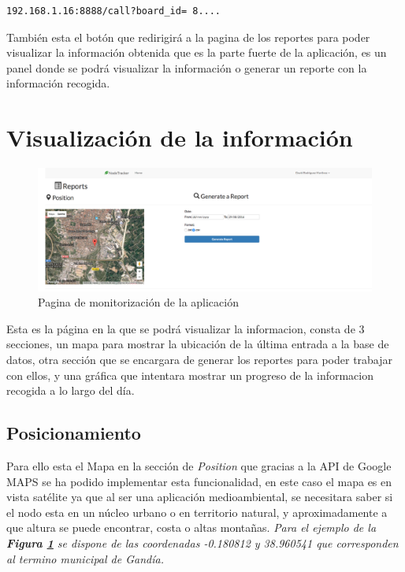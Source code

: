 \begin{lstlisting}[caption=Ejemplo para una ID diferente, label=getstringexaple]
192.168.1.16:8888/call?board_id= 8....
\end{lstlisting}

También esta el botón que redirigirá a la pagina de los reportes para poder visualizar la información obtenida que es la parte fuerte de la aplicación, es un panel donde se podrá visualizar la información o generar un reporte con la información recogida.
\clearpage

\section{Visualización  de la información}

\begin{figure}[!h]
	\centering
	\includegraphics[width=1.0\linewidth]{figuras/nodereport}
	\caption{Pagina de monitorización de la aplicación}
	\label{fig:nodereport}
\end{figure}

Esta es la página en la que se podrá visualizar la informacion, consta de 3 secciones, un mapa para mostrar la ubicación de la última entrada a la base de datos, otra sección que se encargara de generar los reportes para poder trabajar con ellos, y una gráfica que intentara mostrar un progreso de la informacion recogida a lo largo del día.

\subsection{Posicionamiento}

Para ello esta el Mapa en la sección de \textit{Position} que gracias a la API de Google MAPS se ha podido implementar esta funcionalidad, en este caso el mapa es en vista satélite ya que al ser una aplicación medioambiental, se necesitara saber si el nodo esta en un núcleo urbano o en territorio natural, y aproximadamente a que altura se puede encontrar, costa o altas montañas. \textit{Para el ejemplo de la \textbf{Figura \ref{fig:nodereport}} se dispone de las coordenadas -0.180812 y 38.960541 que corresponden al termino municipal de Gandía.} 

